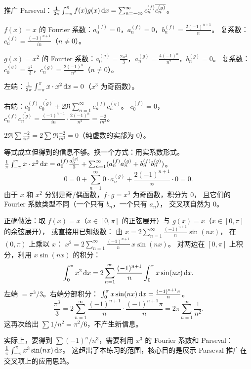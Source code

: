 \documentclass{ctexart}
\begin{document}
\begin{solution}
  推广 Parseval：$\frac{1}{2\pi}\int_{-\pi}^{\pi} f(x)g(x) \,\mathrm{d} x
  = \sum_{n=-\infty}^{\infty} c_n^{(f)}\overline{c_n^{(g)}}$。

  $f(x) = x$ 的 Fourier 系数：$a_0^{(f)} = 0$，$a_n^{(f)} = 0$，$b_n^{(f)} = \frac{2(-1)^{n+1}}{n}$。
  复系数：$c_n^{(f)} = \frac{(-1)^{n+1}}{in}$（$n \ne 0$）。

  $g(x) = x^2$ 的 Fourier 系数：$a_0^{(g)} = \frac{2\pi^2}{3}$，$a_n^{(g)} = \frac{4(-1)^n}{n^2}$，$b_n^{(g)} = 0$。
  复系数：$c_0^{(g)} = \frac{\pi^2}{3}$，$c_n^{(g)} = \frac{2(-1)^n}{n^2}$（$n \ne 0$）。

  左端：$\frac{1}{2\pi}\int_{-\pi}^{\pi} x \cdot x^2 \,\mathrm{d} x = 0$（$x^3$ 为奇函数）。

  右端：$c_0^{(f)}\overline{c_0^{(g)}} + 2\Re\sum_{n=1}^{\infty} c_n^{(f)}\overline{c_n^{(g)}}$。
  $c_0^{(f)} = 0$，$c_n^{(f)}\overline{c_n^{(g)}} = \frac{(-1)^{n+1}}{in}\cdot\frac{2(-1)^n}{n^2}
  = \frac{-2}{in^3}$。

  $2\Re\sum \frac{-2}{in^3} = 2\sum \Re\frac{-2}{in^3} = 0$（纯虚数的实部为 0）。

  等式成立但得到的信息不够。换一个方式：用实系数形式。
  $\frac{1}{\pi}\int_{-\pi}^{\pi} x \cdot x^2 \,\mathrm{d} x
  = a_0^{(f)}\frac{a_0^{(g)}}{2} + \sum_{n=1}^\infty (a_n^{(f)}a_n^{(g)} + b_n^{(f)}b_n^{(g)})$。
  \[
    0 = 0 + \sum_{n=1}^\infty 0 \cdot a_n^{(g)} + \frac{2(-1)^{n+1}}{n}\cdot 0 = 0.
  \]
  由于 $x$ 和 $x^2$ 分别是奇/偶函数，$f \cdot g = x^3$ 为奇函数，积分为 $0$，
  且它们的 Fourier 系数类型不同（一个只有 $b_n$，一个只有 $a_n$），
  交叉项自然为 $0$。

  正确做法：取 $f(x) = x$（$x \in [0,\pi]$ 的正弦展开）与 $g(x) = x$（$x \in [0,\pi]$ 的余弦展开），
  或直接用已知级数：
  由 $x = 2\sum_{n=1}^\infty \frac{(-1)^{n+1}}{n}\sin(nx)$，
  在 $(0,\pi)$ 上乘以 $x$：
  $x^2 = 2\sum_{n=1}^\infty \frac{(-1)^{n+1}}{n}\,x\sin(nx)$。
  对两边在 $[0,\pi]$ 上积分，利用 $x\sin(nx)$ 的积分：
  \[
    \int_0^\pi x^2 \,\mathrm{d} x = 2\sum_{n=1}^\infty \frac{(-1)^{n+1}}{n}\int_0^\pi x\sin(nx)\,\mathrm{d} x.
  \]
  左端 $= \pi^3/3$。右端分部积分：
  $\int_0^\pi x\sin(nx)\,\mathrm{d} x = \frac{(-1)^{n+1}\pi}{n}$。
  \[
    \frac{\pi^3}{3} = 2\sum_{n=1}^\infty \frac{(-1)^{n+1}}{n}\cdot\frac{(-1)^{n+1}\pi}{n}
    = 2\pi\sum_{n=1}^\infty \frac{1}{n^2}.
  \]
  这再次给出 $\sum 1/n^2 = \pi^2/6$，不产生新信息。

  实际上，要得到 $\sum (-1)^n/n^3$，需要利用 $x^3$ 的 Fourier 系数和 Parseval：
  $\frac{1}{\pi}\int_{-\pi}^{\pi} x^3\sin(nx)\,\mathrm{d} x$。
  这超出了本练习的范围，核心目的是展示 Parseval 推广在交叉项上的应用思路。
\end{solution}
\end{document}
